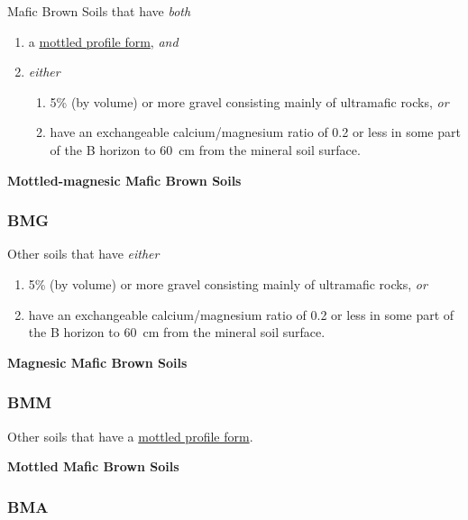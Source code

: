 \documentclass[
  letterpaper,
  DIV=11,
  numbers=noendperiod]{scrreprt}
\providecommand{\tightlist}{%
  \setlength{\itemsep}{0pt}\setlength{\parskip}{0pt}}\usepackage{longtable,booktabs,array}
\begin{document}
Mafic Brown Soils that have \emph{both}

\begin{enumerate}
\def\labelenumi{\arabic{enumi}.}
\tightlist
\item
  a \protect\hyperlink{sec-diag-mottpf}{mottled profile form},
  \emph{and}
\item
  \emph{either}

  \begin{enumerate}
  \def\labelenumii{(\alph{enumii})}
  \tightlist
  \item
    5\% (by volume) or more gravel consisting mainly of ultramafic
    rocks, \emph{or}
  \item
    have an exchangeable calcium/magnesium ratio of 0.2 or less in some
    part of the B horizon to 60~cm from the mineral soil surface.
  \end{enumerate}
\end{enumerate}

\textbf{Mottled-magnesic Mafic Brown Soils}

\hypertarget{sec-key-BMG}{%
\subsubsection{\texorpdfstring{\textbf{BMG}}{BMG}}\label{sec-key-BMG}}

Other soils that have \emph{either}

\begin{enumerate}
\def\labelenumi{\arabic{enumi}.}
\tightlist
\item
  5\% (by volume) or more gravel consisting mainly of ultramafic rocks,
  \emph{or}
\item
  have an exchangeable calcium/magnesium ratio of 0.2 or less in some
  part of the B horizon to 60~cm from the mineral soil surface.
\end{enumerate}

\textbf{Magnesic Mafic Brown Soils}

\hypertarget{sec-key-BMM}{%
\subsubsection{\texorpdfstring{\textbf{BMM}}{BMM}}\label{sec-key-BMM}}

Other soils that have a \protect\hyperlink{sec-diag-mottpf}{mottled
profile form}.

\textbf{Mottled Mafic Brown Soils}

\hypertarget{sec-key-BMA}{%
\subsubsection{\texorpdfstring{\textbf{BMA}}{BMA}}\label{sec-key-BMA}}
\end{document}
